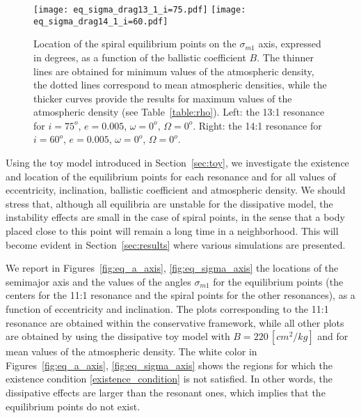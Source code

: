 \documentclass[12pt,reqno]{amsart}
\numberwithin{equation}{section}
\begin{document}
\begin{figure}[h]
\centering {} 
\texttt{[image: eq\_sigma\_drag13\_1\_i=75.pdf]}
\texttt{[image: eq\_sigma\_drag14\_1\_i=60.pdf]}
 \caption{Location of the spiral equilibrium points on the
$\sigma_{m1}$ axis, expressed in degrees, as a function of the
ballistic coefficient $B$. The thinner lines are obtained for minimum
values of the atmospheric density, the dotted lines correspond to
mean atmospheric densities, while the thicker curves provide the
results for maximum values of the atmospheric density (see
Table~\ref{table:rho}). Left: the 13:1 resonance for $i=75^o$,
$e=0.005$, $\omega=0^o$, $\Omega=0^o$. Right: the 14:1 resonance
for $i=60^o$, $e=0.005$, $\omega=0^o$, $\Omega=0^o$.}
\label{fig:shift_sigma}
\end{figure}






Using the toy model introduced in Section~\ref{sec:toy},
we investigate the existence and location of the equilibrium points for each resonance and for
all values of eccentricity, inclination, ballistic coefficient and atmospheric density. We should stress that,
although all equilibria are unstable for the dissipative model,  the instability effects are small in the case of spiral points,
in the sense that a body placed close to this point will remain a long time in a neighborhood.
This will become evident in Section~\ref{sec:results} where various simulations are presented.


We report in Figures~\ref{fig:eq_a_axis}, \ref{fig:eq_sigma_axis} the locations of the semimajor axis and
the values of the angles $\sigma_{m1}$ for the equilibrium points (the centers for the 11:1 resonance and the spiral points
for the other resonances), as a function of eccentricity and inclination.
The plots corresponding to the 11:1 resonance are obtained within the conservative framework, while all
other plots are obtained by using the dissipative toy model with  $B=220\, [cm^2/kg]$ and for mean values
of the atmospheric density. The white color in Figures~\ref{fig:eq_a_axis}, \ref{fig:eq_sigma_axis} shows the
regions for which the existence condition \eqref{existence_condition} is not satisfied. In other words,
the dissipative effects are larger than the resonant ones, which implies that the equilibrium points do not exist.
\end{document}

